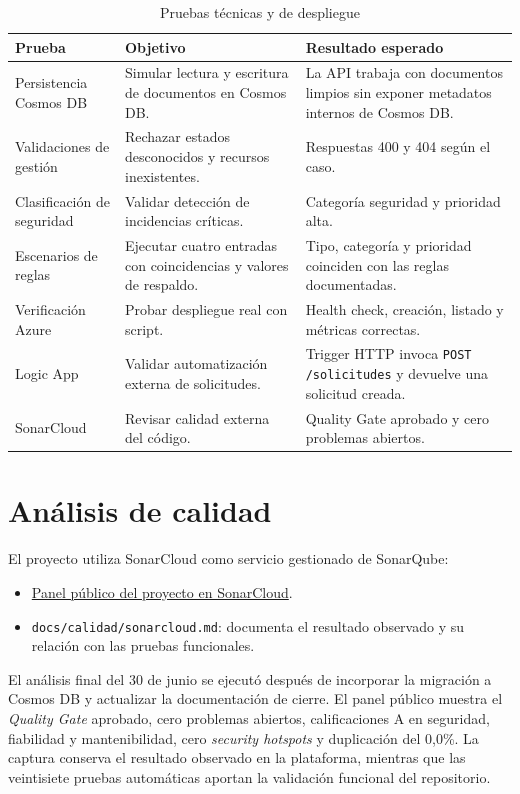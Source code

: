 \begin{table}[h]
\centering
\scriptsize
\renewcommand{\arraystretch}{0.9}
\begin{tabularx}{\textwidth}{l X X}
\textbf{Prueba} & \textbf{Objetivo} & \textbf{Resultado esperado} \\
\hline
Persistencia Cosmos DB & Simular lectura y escritura de documentos en Cosmos DB. & La API trabaja con documentos limpios sin exponer metadatos internos de Cosmos DB. \\
Validaciones de gestión & Rechazar estados desconocidos y recursos inexistentes. & Respuestas 400 y 404 según el caso. \\
Clasificación de seguridad & Validar detección de incidencias críticas. & Categoría seguridad y prioridad alta. \\
Escenarios de reglas & Ejecutar cuatro entradas con coincidencias y valores de respaldo. & Tipo, categoría y prioridad coinciden con las reglas documentadas. \\
Verificación Azure & Probar despliegue real con script. & Health check, creación, listado y métricas correctas. \\
Logic App & Validar automatización externa de solicitudes. & Trigger HTTP invoca \texttt{POST /solicitudes} y devuelve una solicitud creada. \\
SonarCloud & Revisar calidad externa del código. & Quality Gate aprobado y cero problemas abiertos. \\
\end{tabularx}
\caption{Pruebas técnicas y de despliegue}
\label{tabla:pruebas_tecnicas}
\end{table}
\FloatBarrier

\section{Análisis de calidad}

El proyecto utiliza SonarCloud como servicio gestionado de SonarQube:

\begin{itemize}
    \item \href{https://sonarcloud.io/project/overview?id=karimadrico_tfg-azure-servicio-empresarial-seguro}{Panel público del proyecto en SonarCloud}.
    \item \texttt{docs/calidad/sonarcloud.md}: documenta el resultado observado y su relación con las pruebas funcionales.
\end{itemize}

El análisis final del 30 de junio se ejecutó después de incorporar la migración a Cosmos DB y actualizar la documentación de cierre. El panel público muestra el \textit{Quality Gate} aprobado, cero problemas abiertos, calificaciones A en seguridad, fiabilidad y mantenibilidad, cero \textit{security hotspots} y duplicación del 0,0\%. La captura conserva el resultado observado en la plataforma, mientras que las veintisiete pruebas automáticas aportan la validación funcional del repositorio.


